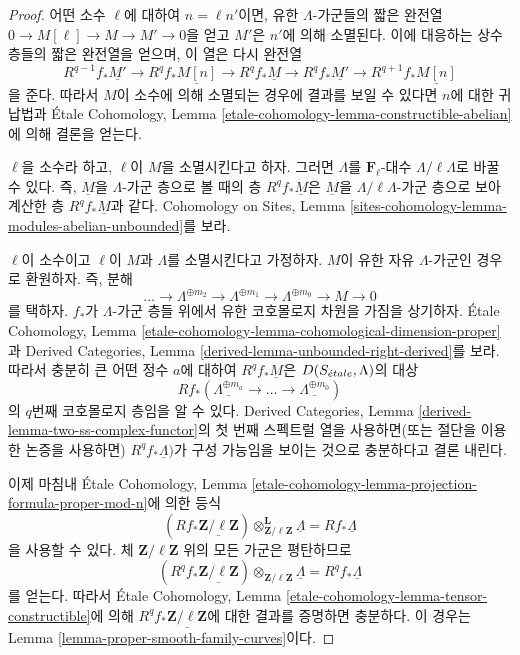 \begin{proof}
어떤 소수 $\ell$에 대하여 $n = \ell n'$이면, 유한 $\Lambda$-가군들의
짧은 완전열 $0 \to M[\ell] \to M \to M' \to 0$을 얻고
$M'$은 $n'$에 의해 소멸된다. 이에 대응하는 상수층들의 짧은 완전열을
얻으며, 이 열은 다시 완전열
$$
R^{q - 1}f_*\underline{M'} \to
R^qf_*\underline{M[n]} \to
R^qf_*\underline{M} \to
R^qf_*\underline{M'} \to
R^{q + 1}f_*\underline{M[n]}
$$
을 준다.
따라서 $M$이 소수에 의해 소멸되는 경우에 결과를 보일 수 있다면
$n$에 대한 귀납법과 \'Etale Cohomology, Lemma
\ref{etale-cohomology-lemma-constructible-abelian}에 의해 결론을
얻는다.

\medskip\noindent
$\ell$을 소수라 하고, $\ell$이 $M$을 소멸시킨다고 하자. 그러면 $\Lambda$를
$\mathbf{F}_\ell$-대수 $\Lambda/\ell \Lambda$로 바꿀 수 있다.
즉, $\underline{M}$을 $\Lambda$-가군 층으로 볼 때의 층
$R^qf_*\underline{M}$은 $\underline{M}$을
$\Lambda/\ell \Lambda$-가군 층으로 보아 계산한 층
$R^qf_*\underline{M}$과 같다. Cohomology on Sites, Lemma
\ref{sites-cohomology-lemma-modules-abelian-unbounded}를 보라.

\medskip\noindent
$\ell$이 소수이고 $\ell$이 $M$과 $\Lambda$를 소멸시킨다고 가정하자.
$M$이 유한 자유 $\Lambda$-가군인 경우로 환원하자.
즉, 분해
$$
\ldots \to
\Lambda^{\oplus m_2} \to
\Lambda^{\oplus m_1} \to
\Lambda^{\oplus m_0} \to
M \to 0
$$
를 택하자. $f_*$가 $\Lambda$-가군 층들 위에서 유한 코호몰로지 차원을
가짐을 상기하자. \'Etale Cohomology, Lemma
\ref{etale-cohomology-lemma-cohomological-dimension-proper}과
Derived Categories, Lemma
\ref{derived-lemma-unbounded-right-derived}를 보라.
따라서 충분히 큰 어떤 정수 $a$에 대하여
$R^qf_*\underline{M}$은 $D(S_{\acute{e}tale}, \Lambda)$의 대상
$$
Rf_*(\underline{\Lambda^{\oplus m_a}} \to \ldots \to
\underline{\Lambda^{\oplus m_0}})
$$
의 $q$번째 코호몰로지 층임을 알 수 있다.
Derived Categories, Lemma
\ref{derived-lemma-two-ss-complex-functor}의 첫 번째 스펙트럴 열을
사용하면(또는 절단을 이용한 논증을 사용하면)
$R^qf_*\underline{\Lambda})$가 구성 가능임을 보이는 것으로 충분하다고
결론 내린다.

\medskip\noindent
이제 마침내 \'Etale Cohomology, Lemma
\ref{etale-cohomology-lemma-projection-formula-proper-mod-n}에 의한 등식
$$
(Rf_*\underline{\mathbf{Z}/\ell\mathbf{Z}})
\otimes_{\mathbf{Z}/\ell\mathbf{Z}}^\mathbf{L} \underline{\Lambda} =
Rf_*\underline{\Lambda}
$$
을 사용할 수 있다. 체 $\mathbf{Z}/\ell\mathbf{Z}$ 위의 모든 가군은
평탄하므로
$$
(R^qf_*\underline{\mathbf{Z}/\ell\mathbf{Z}})
\otimes_{\mathbf{Z}/\ell\mathbf{Z}} \underline{\Lambda} =
R^qf_*\underline{\Lambda}
$$
를 얻는다. 따라서 \'Etale Cohomology, Lemma
\ref{etale-cohomology-lemma-tensor-constructible}에 의해
$R^qf_*\underline{\mathbf{Z}/\ell\mathbf{Z}}$에 대한 결과를 증명하면
충분하다. 이 경우는 Lemma
\ref{lemma-proper-smooth-family-curves}이다.
\end{proof}


